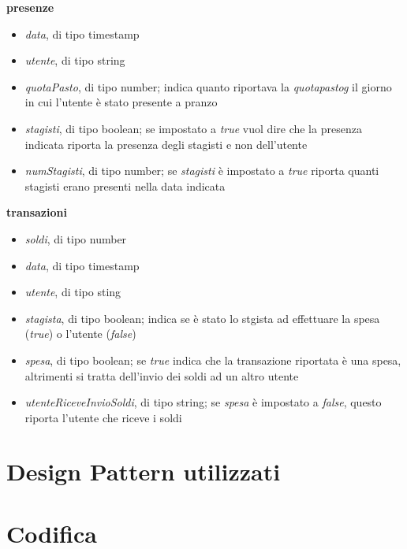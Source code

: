 \textbf{presenze}
\begin{itemize}
    \item \emph{data}, di tipo timestamp
    \item \emph{utente}, di tipo string
    \item \emph{quotaPasto}, di tipo number; indica quanto riportava la \emph{\gls{quotapastog}} il giorno in cui l'utente è stato presente a pranzo
    \item \emph{stagisti}, di tipo boolean; se impostato a \emph{true} vuol dire che la presenza indicata riporta la presenza degli stagisti e non dell'utente
    \item \emph{numStagisti}, di tipo number; se \emph{stagisti} è impostato a \emph{true} riporta quanti stagisti erano presenti nella data indicata
\end{itemize}
\newpage
\textbf{transazioni}
\begin{itemize}
    \item \emph{soldi}, di tipo number
    \item \emph{data}, di tipo timestamp
    \item \emph{utente}, di tipo sting
    \item \emph{stagista}, di tipo boolean; indica se è stato lo stgista ad effettuare la spesa (\emph{true}) o l'utente (\emph{false})
    \item \emph{spesa}, di tipo boolean; se \emph{true} indica che la transazione riportata è una spesa, altrimenti si tratta dell'invio dei soldi ad un altro utente
    \item \emph{utenteRiceveInvioSoldi}, di tipo string; se \emph{spesa} è impostato a \emph{false}, questo riporta l'utente che riceve i soldi
\end{itemize}

\newpage

\section{Design Pattern utilizzati}

\section{Codifica} %
